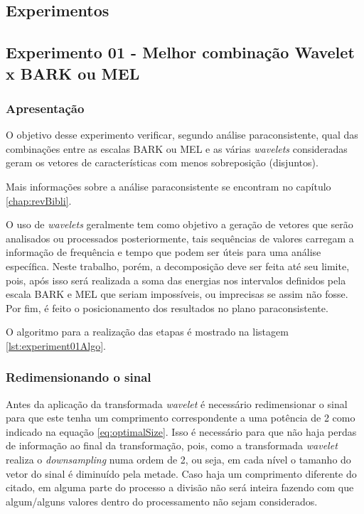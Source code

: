 \begin{myenv}{1.5}
		\section{Experimentos}
			\subsection{Experimento 01 - Melhor combinação Wavelet x BARK ou MEL}
			\label{chap:propApproach:sec:Experimento01}
				\subsubsection{Apresentação}
					\par O objetivo desse experimento verificar, segundo análise paraconsistente, qual das combinações entre as escalas BARK ou MEL e as várias \textit{wavelets} consideradas geram os vetores de características com menos sobreposição (disjuntos).
					
					\par Mais informações sobre a análise paraconsistente se encontram no capítulo \ref{chap:revBibli}. 
					
					\par O uso de \textit{wavelets} geralmente tem como objetivo a geração de vetores que serão analisados ou processados posteriormente, tais sequências de valores carregam a informação de frequência e tempo que podem ser úteis para uma análise específica. Neste trabalho, porém, a decomposição deve ser feita até seu limite, pois, após isso será realizada a soma das energias nos intervalos definidos pela escala BARK e MEL que seriam impossíveis, ou imprecisas se assim não fosse. Por fim, é feito o posicionamento dos resultados no plano paraconsistente.
					
					\par O algoritmo para a realização das etapas é mostrado na listagem \ref{lst:experiment01Algo}.
				
				\subsubsection{Redimensionando o sinal}
					\par Antes da aplicação da transformada \textit{wavelet} é necessário redimensionar o sinal para que este tenha um comprimento correspondente a uma potência de 2 como indicado na equação \ref{eq:optimalSize}. Isso é necessário para que não haja perdas de informação ao final da transformação, pois, como a transformada \textit{wavelet} realiza o \textit{downsampling} numa ordem de 2, ou seja, em cada nível o tamanho do vetor do sinal é diminuído pela metade. Caso haja um comprimento diferente do citado, em alguma parte do processo a divisão não será inteira fazendo com que algum/alguns valores dentro do processamento não sejam considerados.
					

\end{myenv}
